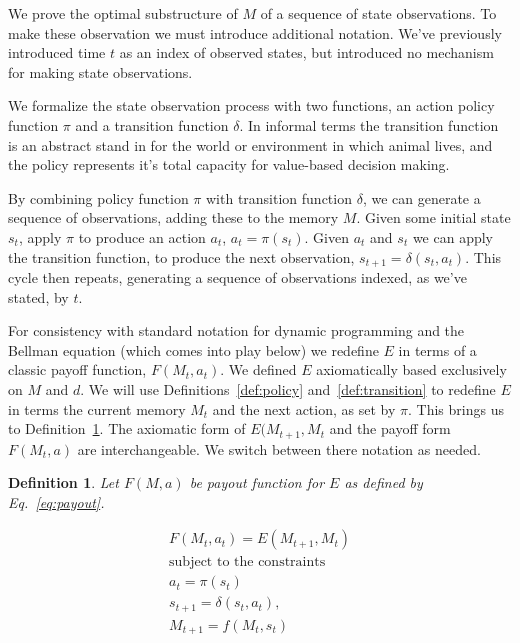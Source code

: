\documentclass[9pt,twocolumn,twoside]{pnas-new}
\newtheorem{definition}{Definition}
\begin{document}
We prove the optimal substructure of $M$ of a sequence of state observations. To make these observation we must introduce additional notation. We've previously introduced time $t$ as an index of observed states, but introduced no mechanism for making state observations. 

We formalize the state observation process with two functions, an action policy function $\pi$ and a transition function $\delta$. In informal terms the transition function is an abstract stand in for the world or environment in which animal lives, and the policy represents it's total capacity for value-based decision making.

By combining policy function $\pi$ with transition function $\delta$, we can generate a sequence of observations, adding these to the memory $M$. Given some initial state $s_{t}$, apply $\pi$ to produce an action $a_t$, $a_t = \pi(s_{t})$. Given $a_t$ and $s_{t}$ we can apply the transition function, to produce the next observation, $s_{t+1} = \delta (s_{t},a_t)$. This cycle then repeats, generating a sequence of observations indexed, as we've stated, by $t$.

For consistency with standard notation for dynamic programming and the Bellman equation (which comes into play below) we redefine $E$ in terms of a classic payoff function, $F(M_{t}, a_t)$. We defined $E$ axiomatically based exclusively on $M$ and $d$. We will use Definitions~\ref{def:policy} and~\ref{def:transition} to redefine $E$ in terms the current memory $M_{t}$ and the next action, as set by $\pi$. This brings us to Definition~\ref{def:payoff}. The axiomatic form of $E(M_{t+1},M_{t}$ and the payoff form $F(M_t, a)$ are interchangeable. We switch between there notation as needed.

\begin{definition}
    \label{def:payoff}
    Let $F(M, a)$ be payout function for $E$ as defined by Eq.~\ref{eq:payout}.
\end{definition}

\begin{equation}
    \begin{split} \label{eq:payout}
    F(M_{t}, a_t) = E(M_{t+1}, M_{t})\\
    \text{subject to the constraints} \\
    a_{t} = \pi(s_t) \\
    s_{t+1} = \delta(s_{t}, a_t),\\ 
    M_{t+1} = f(M_{t}, s_{t})
    \end{split} 
\end{equation}
\end{document}
